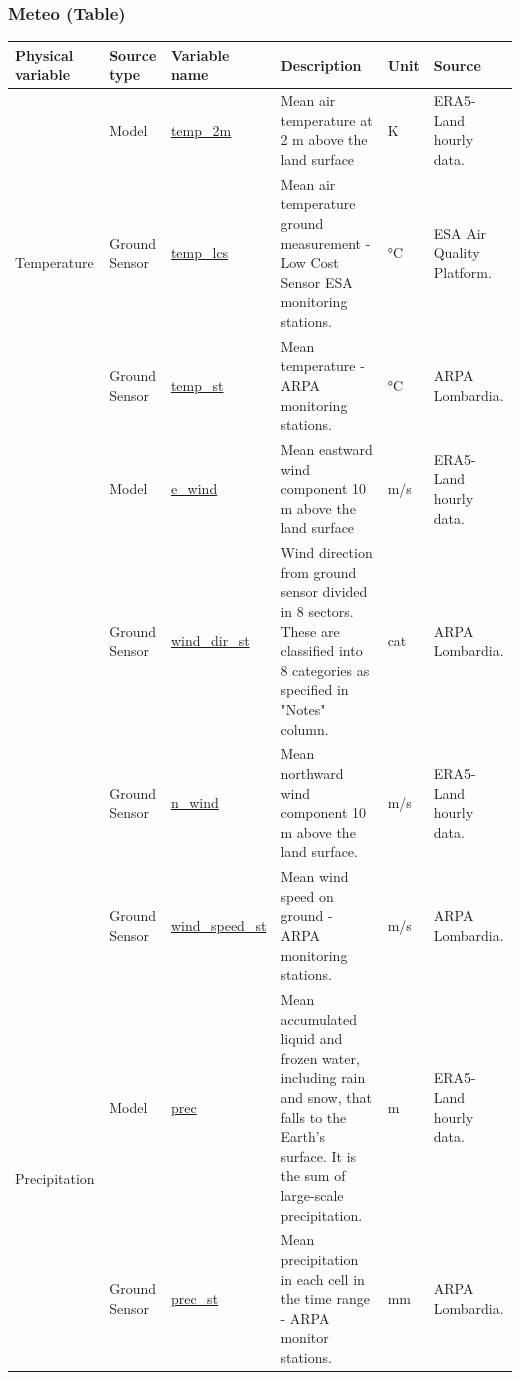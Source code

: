\subsubsection{Meteo (Table)}
\begin{center}
\setlength{\arrayrulewidth}{1.5pt}

\begin{longtable}{ |p{2cm}|p{1.5cm}|p{2.3cm}|p{4cm}|p{1cm}|p{2cm}| } 
\hline
\textbf{Physical variable} & \textbf{Source type}  & \textbf{Variable name}  & \textbf{Description}  & \textbf{Unit}  & \textbf{Source}\\ 
\hline
\multirow{3}{4em}{Temperature} & Model  & \underline{temp\_2m} & Mean air temperature at 2 m above the land surface & K & ERA5-Land hourly data.\\ 
& Ground \newline Sensor  & \underline{temp\_lcs} &  Mean air temperature ground measurement - Low Cost Sensor ESA monitoring stations. & °C & ESA Air Quality Platform.\\ 
& Ground \newline Sensor  & \underline{temp\_st} &  Mean temperature - ARPA monitoring stations. & °C & ARPA \newline Lombardia.\\ \hline
\pagebreak
\hline
\multirow{4}{4em}{Wind} & Model  & \underline{e\_wind} & Mean eastward wind component 10 m above the land surface & m/s & ERA5-Land hourly data.\\ 
& Ground \newline Sensor  & \underline{wind\_dir\_st} &  Wind direction from ground sensor divided in 8 sectors. These are classified into 8 categories as specified in "Notes" column. & cat & ARPA \newline Lombardia.\\ 
& Ground \newline Sensor  & \underline{n\_wind} &  Mean northward wind component 10 m above the land surface. & m/s & ERA5-Land hourly data.\\
& Ground \newline Sensor  & \underline{wind\_speed\_st} &  Mean wind speed on ground  - ARPA monitoring stations. & m/s& ARPA \newline Lombardia.\\ \hline

\multirow{2}{4em}{Precipitation} & Model  & \underline{prec} & Mean accumulated liquid and frozen water, including rain and snow, that falls to the Earth's surface. It is the sum of large-scale precipitation. & m & ERA5-Land hourly data.\\ 
& Ground \newline Sensor  & \underline{prec\_st} &  Mean precipitation in each cell in the time range - ARPA monitor stations. & mm & ARPA \newline Lombardia.\\ \hline


\end{longtable}
\end{center}
